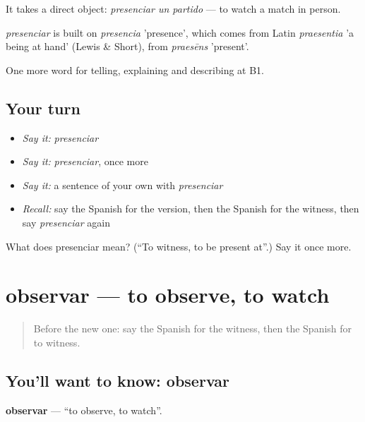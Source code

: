 It takes a direct object: \emph{presenciar un partido} — to watch a match in person.

\begin{cousinweb}
\emph{presenciar} is built on \emph{presencia} 'presence', which comes from Latin \emph{praesentia} 'a being at hand' (Lewis \& Short), from \emph{praesēns} 'present'.
\end{cousinweb}

\begin{grammarlens}[title={What you've built}]
One more word for telling, explaining and describing at B1.
\end{grammarlens}

\subsection*{Your turn}
\begin{itemize}
\raggedright
  \item \emph{Say it:} \emph{presenciar}
  \item \emph{Say it:} \emph{presenciar}, once more
  \item \emph{Say it:} a sentence of your own with \emph{presenciar}
  \item \emph{Recall:} say the Spanish for the version, then the Spanish for the witness, then say \emph{presenciar} again
\end{itemize}

\begin{tcolorbox}[breakable,colback=teal!4,colframe=teal!35!black,title={Before you move on}]
What does presenciar mean? (\textquotedblleft{}To witness, to be present at\textquotedblright{}.) Say it once more.
\end{tcolorbox}
\section[observar]{observar — to observe, to watch}

\label{lesson:ES-C517-observar}



\begin{quote}
Before the new one: say the Spanish for the witness, then the Spanish for to witness.
\end{quote}

\subsection*{You'll want to know: observar}
\textbf{observar} — \textquotedblleft{}to observe, to watch\textquotedblright{}.

